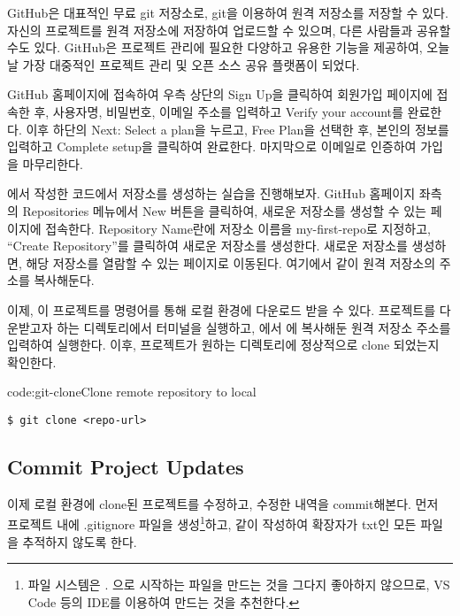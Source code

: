 GitHub은 대표적인 무료 git 저장소로, git을 이용하여 원격 저장소를 저장할 수 있다. 자신의 프로젝트를 원격 저장소에 저장하여 업로드할 수 있으며, 다른 사람들과 공유할 수도 있다. GitHub은 프로젝트 관리에 필요한 다양하고 유용한 기능을 제공하여, 오늘날 가장 대중적인 프로젝트 관리 및 오픈 소스 공유 플랫폼이 되었다.

GitHub 홈페이지에 접속하여 우측 상단의 Sign Up을 클릭하여 회원가입 페이지에 접속한 후, 사용자명, 비밀번호, 이메일 주소를 입력하고 Verify your account를 완료한다. 이후 하단의 Next: Select a plan을 누르고, Free Plan을 선택한 후, 본인의 정보를 입력하고 Complete setup을 클릭하여 완료한다. 마지막으로 이메일로 인증하여 가입을 마무리한다.

에서 작성한 코드에서 저장소를 생성하는 실습을 진행해보자. GitHub 홈페이지 좌측의 Repositories 메뉴에서 New 버튼을 클릭하여, 새로운 저장소를 생성할 수 있는 페이지에 접속한다. Repository Name란에 저장소 이름을 my-first-repo로 지정하고, ``Create Repository''를 클릭하여 새로운 저장소를 생성한다. 새로운 저장소를 생성하면, 해당 저장소를 열람할 수 있는 페이지로 이동된다. 여기에서 \과 같이 원격 저장소의 주소를 복사해둔다.


이제, 이 프로젝트를  명령어를 통해 로컬 환경에 다운로드 받을 수 있다. 프로젝트를 다운받고자 하는 디렉토리에서 터미널을 실행하고, 에서 에 복사해둔 원격 저장소 주소를 입력하여 실행한다. 이후, 프로젝트가 원하는 디렉토리에 정상적으로 clone 되었는지 확인한다.

\begin{codeenv}{code:git-clone}{Clone remote repository to local}\begin{verbatim}
$ git clone <repo-url>
\end{verbatim}
\end{codeenv}

\subsection*{Commit Project Updates}

이제 로컬 환경에 clone된 프로젝트를 수정하고, 수정한 내역을 commit해본다. 먼저 프로젝트 내에 .gitignore 파일을 생성\footnote{파일 시스템은 . 으로 시작하는 파일을 만드는 것을 그다지 좋아하지 않으므로, VS Code 등의 IDE를 이용하여 만드는 것을 추천한다.}하고, \과 같이 작성하여 확장자가 txt인 모든 파일을 추적하지 않도록 한다.

